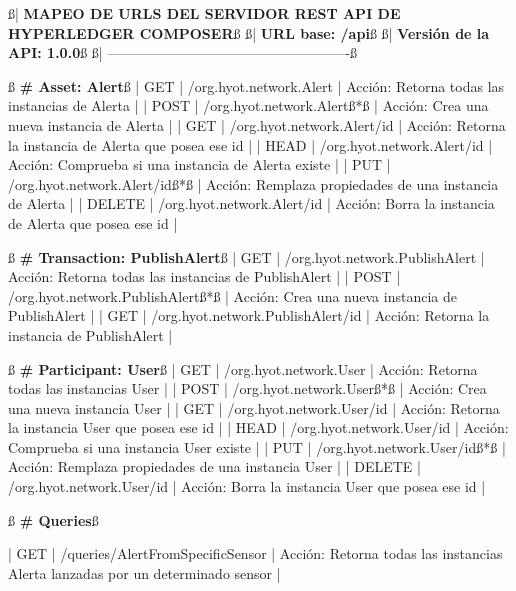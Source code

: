 \documentclass[12pt,a4paper, twoside]{report}
\begin{document}
\begin{listing}[style=consola, basicstyle=\ttfamily\scriptsize, numbers=none, escapechar=ß]
ß{\color{ballblue}| \textbf{MAPEO DE URLS DEL SERVIDOR REST API DE HYPERLEDGER COMPOSER}}ß
ß{\color{ballblue}| \textbf{URL base: /api}}ß
ß{\color{ballblue}| \textbf{Versión de la API: 1.0.0}}ß
ß{\color{ballblue}| ----------------------------------------------------}ß

ß\textbf{{\color{maroon} \# Asset: Alert}}ß
| GET    | /org.hyot.network.Alert         | Acción: Retorna todas las instancias de Alerta           |
| POST   | /org.hyot.network.Alertß{\color{red}*}ß        | Acción: Crea una nueva instancia de Alerta               |
| GET    | /org.hyot.network.Alert/{id}    | Acción: Retorna la instancia de Alerta que posea ese id  |
| HEAD   | /org.hyot.network.Alert/{id}    | Acción: Comprueba si una instancia de Alerta existe      |
| PUT    | /org.hyot.network.Alert/{id}ß{\color{red}*}ß   | Acción: Remplaza propiedades de una instancia de Alerta  |
| DELETE | /org.hyot.network.Alert/{id}    | Acción: Borra la instancia de Alerta que posea ese id    |
 
 ß\textbf{{\color{maroon} \# Transaction: PublishAlert}}ß
| GET    | /org.hyot.network.PublishAlert  | Acción: Retorna todas las instancias de PublishAlert     |
| POST   | /org.hyot.network.PublishAlertß{\color{red}*}ß | Acción: Crea una nueva instancia de PublishAlert         |
| GET    | /org.hyot.network.PublishAlert/{id} | Acción: Retorna la instancia de PublishAlert         |

ß\textbf{{\color{maroon} \# Participant: User}}ß
| GET    | /org.hyot.network.User          | Acción: Retorna todas las instancias User                |
| POST   | /org.hyot.network.Userß{\color{red}*}ß         | Acción: Crea una nueva instancia User                    |
| GET    | /org.hyot.network.User/{id}     | Acción: Retorna la instancia User que posea ese id       |
| HEAD   | /org.hyot.network.User/{id}     | Acción: Comprueba si una instancia User existe           |
| PUT    | /org.hyot.network.User/{id}ß{\color{red}*}ß    | Acción: Remplaza propiedades de una instancia User       |
| DELETE | /org.hyot.network.User/{id}     | Acción: Borra la instancia User que posea ese id         |
 
ß\textbf{{\color{maroon} \# Queries}}ß

| GET    | /queries/AlertFromSpecificSensor | Acción: Retorna todas las instancias Alerta lanzadas por un determinado sensor |
 

\end{listing}
\end{document}
